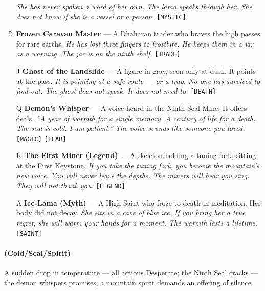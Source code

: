\begin{enumerate}
  \hfill \textit{She has never spoken a word of her own. The lama speaks through her. She does not know if she is a vessel or a person.} \texttt{[MYSTIC]}
\item \textbf{Frozen Caravan Master} --- A Dhaharan trader who braves the high passes for rare earths.
  \hfill \textit{He has lost three fingers to frostbite. He keeps them in a jar as a warning. The jar is on the ninth shelf.} \texttt{[TRADE]}
\item[J] \textbf{Ghost of the Landslide} --- A figure in gray, seen only at dusk. It points at the pass.
  \hfill \textit{It is pointing at a safe route --- or a trap. No one has survived to find out. The ghost does not speak. It does not need to.} \texttt{[DEATH]}
\item[Q] \textbf{Demon's Whisper} --- A voice heard in the Ninth Seal Mine. It offers deals.
  \hfill \textit{``A year of warmth for a single memory. A century of life for a death. The seal is cold. I am patient.'' The voice sounds like someone you loved.} \texttt{[MAGIC]} \texttt{[FEAR]}
\item[K] \textbf{The First Miner (Legend)} --- A skeleton holding a tuning fork, sitting at the First Keystone.
  \hfill \textit{If you take the tuning fork, you become the mountain's new voice. You will never leave the depths. The miners will hear you sing. They will not thank you.} \texttt{[LEGEND]}
\item[A] \textbf{Ice-Lama (Myth)} --- A High Saint who froze to death in meditation. Her body did not decay.
  \hfill \textit{She sits in a cave of blue ice. If you bring her a true regret, she will warm your hands for a moment. The warmth lasts a lifetime.} \texttt{[SAINT]}
\end{enumerate}

\paragraph*{(Cold/Seal/Spirit)} A sudden drop in temperature --- all actions Desperate; the Ninth Seal cracks --- the demon whispers promises; a mountain spirit demands an offering of silence.

